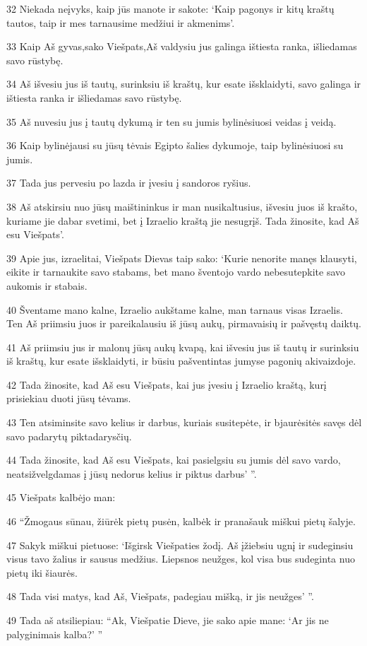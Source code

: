 \par 32 Niekada neįvyks, kaip jūs manote ir sakote: ‘Kaip pagonys ir kitų kraštų tautos, taip ir mes tarnausime medžiui ir akmenims’. 
\par 33 Kaip Aš gyvas,­sako Viešpats,­Aš valdysiu jus galinga ištiesta ranka, išliedamas savo rūstybę. 
\par 34 Aš išvesiu jus iš tautų, surinksiu iš kraštų, kur esate išsklaidyti, savo galinga ir ištiesta ranka ir išliedamas savo rūstybę. 
\par 35 Aš nuvesiu jus į tautų dykumą ir ten su jumis bylinėsiuosi veidas į veidą. 
\par 36 Kaip bylinėjausi su jūsų tėvais Egipto šalies dykumoje, taip bylinėsiuosi su jumis. 
\par 37 Tada jus pervesiu po lazda ir įvesiu į sandoros ryšius. 
\par 38 Aš atskirsiu nuo jūsų maištininkus ir man nusikaltusius, išvesiu juos iš krašto, kuriame jie dabar svetimi, bet į Izraelio kraštą jie nesugrįš. Tada žinosite, kad Aš esu Viešpats’. 
\par 39 Apie jus, izraelitai, Viešpats Dievas taip sako: ‘Kurie nenorite manęs klausyti, eikite ir tarnaukite savo stabams, bet mano šventojo vardo nebesutepkite savo aukomis ir stabais. 
\par 40 Šventame mano kalne, Izraelio aukštame kalne, man tarnaus visas Izraelis. Ten Aš priimsiu juos ir pareikalausiu iš jūsų aukų, pirmavaisių ir pašvęstų daiktų. 
\par 41 Aš priimsiu jus ir malonų jūsų aukų kvapą, kai išvesiu jus iš tautų ir surinksiu iš kraštų, kur esate išsklaidyti, ir būsiu pašventintas jumyse pagonių akivaizdoje. 
\par 42 Tada žinosite, kad Aš esu Viešpats, kai jus įvesiu į Izraelio kraštą, kurį prisiekiau duoti jūsų tėvams. 
\par 43 Ten atsiminsite savo kelius ir darbus, kuriais susitepėte, ir bjaurėsitės savęs dėl savo padarytų piktadarysčių. 
\par 44 Tada žinosite, kad Aš esu Viešpats, kai pasielgsiu su jumis dėl savo vardo, neatsižvelgdamas į jūsų nedorus kelius ir piktus darbus’ ”. 
\par 45 Viešpats kalbėjo man: 
\par 46 “Žmogaus sūnau, žiūrėk pietų pusėn, kalbėk ir pranašauk miškui pietų šalyje. 
\par 47 Sakyk miškui pietuose: ‘Išgirsk Viešpaties žodį. Aš įžiebsiu ugnį ir sudeginsiu visus tavo žalius ir sausus medžius. Liepsnos neužges, kol visa bus sudeginta nuo pietų iki šiaurės. 
\par 48 Tada visi matys, kad Aš, Viešpats, padegiau mišką, ir jis neužges’ ”. 
\par 49 Tada aš atsiliepiau: “Ak, Viešpatie Dieve, jie sako apie mane: ‘Ar jis ne palyginimais kalba?’ ”



